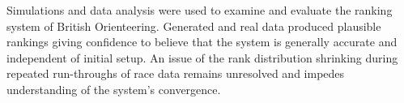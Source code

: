 Simulations and data analysis were used to examine and evaluate the ranking system of British Orienteering. Generated and real data produced plausible rankings giving confidence to believe that the system is generally accurate and independent of initial setup. An issue of the rank distribution shrinking during repeated run-throughs of race data remains unresolved and impedes understanding of the system's convergence.